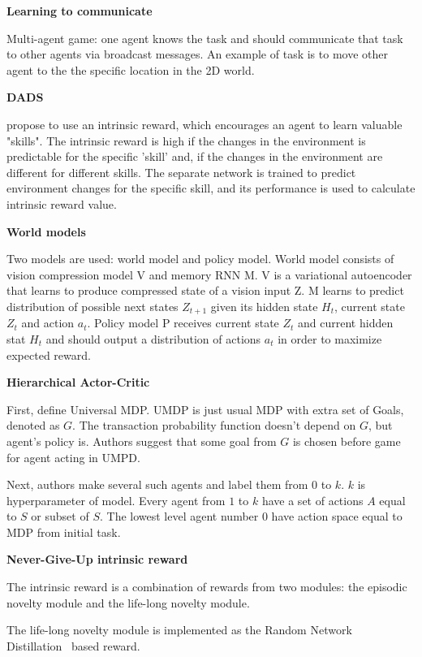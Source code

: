 \documentclass{article}
\begin{document}
\textbf{Learning to communicate}~\citep{Mordatch2018EmergenceOG}

Multi-agent game: one agent knows the task and should communicate that task to other agents via broadcast messages. An example of task is to move other agent to the the specific location in the 2D world.

\textbf{DADS}

\citep{Sharma2020DynamicsAwareUD} propose to use an intrinsic reward, which encourages an agent to learn valuable "skills". The intrinsic reward is high if the changes in the environment is predictable for the specific 'skill' and, if the changes in the environment are different for different skills. The separate network is trained to predict environment changes for the specific skill, and its performance is used to calculate intrinsic reward value.

\textbf{World models}~\citep{Ha2018RecurrentWM}

Two models are used: world model and policy model. World model consists of vision compression model V and memory RNN M. V is a variational autoencoder that learns to produce compressed state of a vision input Z. M learns to predict distribution of possible next states $Z_{t+1}$ given its hidden state $H_t$, current state $Z_t$ and action $a_t$. Policy model P receives current state $Z_t$ and current hidden stat $H_t$ and should output a distribution of actions $a_t$ in order to maximize expected reward.

\textbf{Hierarchical Actor-Critic}~\citep{levy2017learning}

First, define Universal MDP. UMDP is just usual MDP with extra set of Goals, denoted as $G$. The transaction probability function doesn't depend on $G$, but agent's policy is. Authors suggest that some goal from $G$ is chosen before game for agent acting in UMPD.

Next, authors make several such agents and label them from $0$ to $k$. $k$ is hyperparameter of model. Every agent from $1$ to $k$ have a set of actions $A$ equal to $S$ or subset of $S$. The lowest level agent number $0$ have action space equal to MDP from initial task.

\textbf{Never-Give-Up intrinsic reward}~\citep{Badia2020NeverGU}

The intrinsic reward is a combination of rewards from two modules: the episodic novelty module and the life-long novelty module.

The life-long novelty module is implemented as the Random Network Distillation~\citep{Burda2019ExplorationBR} based reward.
\end{document}

